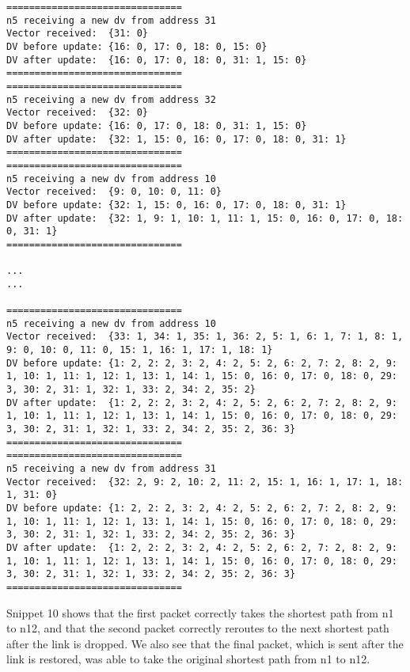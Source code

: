 \documentclass[11pt]{article}
\begin{document}
 \begin{lstlisting} 
===============================
n5 receiving a new dv from address 31
Vector received:  {31: 0}
DV before update: {16: 0, 17: 0, 18: 0, 15: 0}
DV after update:  {16: 0, 17: 0, 18: 0, 31: 1, 15: 0}
===============================
===============================
n5 receiving a new dv from address 32
Vector received:  {32: 0}
DV before update: {16: 0, 17: 0, 18: 0, 31: 1, 15: 0}
DV after update:  {32: 1, 15: 0, 16: 0, 17: 0, 18: 0, 31: 1}
===============================
===============================
n5 receiving a new dv from address 10
Vector received:  {9: 0, 10: 0, 11: 0}
DV before update: {32: 1, 15: 0, 16: 0, 17: 0, 18: 0, 31: 1}
DV after update:  {32: 1, 9: 1, 10: 1, 11: 1, 15: 0, 16: 0, 17: 0, 18: 0, 31: 1}
===============================

...
...

===============================
n5 receiving a new dv from address 10
Vector received:  {33: 1, 34: 1, 35: 1, 36: 2, 5: 1, 6: 1, 7: 1, 8: 1, 9: 0, 10: 0, 11: 0, 15: 1, 16: 1, 17: 1, 18: 1}
DV before update: {1: 2, 2: 2, 3: 2, 4: 2, 5: 2, 6: 2, 7: 2, 8: 2, 9: 1, 10: 1, 11: 1, 12: 1, 13: 1, 14: 1, 15: 0, 16: 0, 17: 0, 18: 0, 29: 3, 30: 2, 31: 1, 32: 1, 33: 2, 34: 2, 35: 2}
DV after update:  {1: 2, 2: 2, 3: 2, 4: 2, 5: 2, 6: 2, 7: 2, 8: 2, 9: 1, 10: 1, 11: 1, 12: 1, 13: 1, 14: 1, 15: 0, 16: 0, 17: 0, 18: 0, 29: 3, 30: 2, 31: 1, 32: 1, 33: 2, 34: 2, 35: 2, 36: 3}
===============================
===============================
n5 receiving a new dv from address 31
Vector received:  {32: 2, 9: 2, 10: 2, 11: 2, 15: 1, 16: 1, 17: 1, 18: 1, 31: 0}
DV before update: {1: 2, 2: 2, 3: 2, 4: 2, 5: 2, 6: 2, 7: 2, 8: 2, 9: 1, 10: 1, 11: 1, 12: 1, 13: 1, 14: 1, 15: 0, 16: 0, 17: 0, 18: 0, 29: 3, 30: 2, 31: 1, 32: 1, 33: 2, 34: 2, 35: 2, 36: 3}
DV after update:  {1: 2, 2: 2, 3: 2, 4: 2, 5: 2, 6: 2, 7: 2, 8: 2, 9: 1, 10: 1, 11: 1, 12: 1, 13: 1, 14: 1, 15: 0, 16: 0, 17: 0, 18: 0, 29: 3, 30: 2, 31: 1, 32: 1, 33: 2, 34: 2, 35: 2, 36: 3}
===============================
\end{lstlisting}

Snippet 10 shows that the first packet correctly takes the shortest path from n1 to n12, and that the second packet correctly reroutes to the next shortest path after the link is dropped. We also see that the final packet, which is sent after the link is restored, was able to take the original shortest path from n1 to n12.
\end{document}
